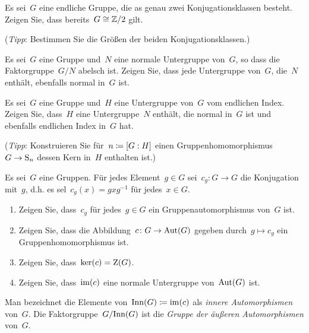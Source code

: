 \documentclass{scrartcl}
\begin{document}
\begin{exercise}
  Es sei~$G$ eine endliche Gruppe, die as genau zwei Konjugationsklassen besteht.
  Zeigen Sie, dass bereits~$G \cong \mathbb{Z}/2$ gilt.

  (\emph{Tipp}: Bestimmen Sie die Größen der beiden Konjugationsklassen.)
\end{exercise}

\begin{exercise}
  Es sei~$G$ eine Gruppe und~$N$ eine normale Untergruppe von~$G$, so dass die Faktorgruppe~$G/N$ abelsch ist.
  Zeigen Sie, dass jede Untergruppe von~$G$, die~$N$ enthält, ebenfalls normal in~$G$ ist.
\end{exercise}

\begin{exercise}
  Es sei~$G$ eine Gruppe und~$H$ eine Untergruppe von~$G$ vom endlichen Index.
  Zeigen Sie, dass~$H$ eine Untergruppe~$N$ enthält, die normal in~$G$ ist und ebenfalls endlichen Index in~$G$ hat.

  (\emph{Tipp}: Konstruieren Sie für~$n \coloneqq [G : H]$ einen Gruppenhomomorphismus~$G \to \Sym_n$ dessen Kern in~$H$ enthalten ist.)
\end{exercise}

\begin{exercise}
  Es sei~$G$ eine Gruppen.
  Für jedes Element~$g \in G$ sei~$c_g \colon G \to G$ die Konjugation mit~$g$, d.h. es sel~$c_g(x) = g x g^{-1}$ für jedes~$x \in G$.
  \begin{enumerate}
    \item
      Zeigen Sie, dass~$c_g$ für jedes~$g \in G$ ein Gruppenautomorphismus von~$G$ ist.
    \item
      Zeigen Sie, dass die Abbildung~$c \colon G \to \Aut(G)$ gegeben durch~$g \mapsto c_g$ ein Gruppenhomomorphismus ist.
    \item
      Zeigen Sie, dass~$\ker(c) = \operatorname{Z}(G)$.
    \item
      Zeigen Sie, dass~$\operatorname{im}(c)$ eine normale Untergruppe von~$\operatorname{Aut}(G)$ ist.
  \end{enumerate}
  Man bezeichnet die Elemente von~$\operatorname{Inn}(G) \coloneqq \operatorname{im}(c)$ als \emph{innere Automorphismen} von~$G$.
  Die Faktorgruppe~$G/{\operatorname{Inn}(G)}$ ist die \emph{Gruppe der äußeren Automorphismen} von~$G$.
\end{exercise}
\end{document}
